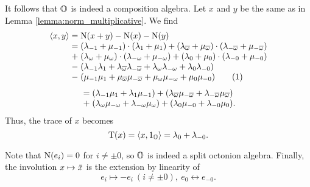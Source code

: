 \noindent It follows that $\mathbb{O}$ is indeed a composition algebra. Let $x$ and $y$ be the same as in Lemma \ref{lemma:norm_multiplicative}. We find
\begin{equation*}
	\begin{array}{r@{\;}c@{\;}l}
		\inner{x}{y} & = & \NN(x+y) - \NN(x) - \NN(y) \\
		
		    & = & (\lambda_{-1} + \mu_{-1}) \cdot ( \lambda_1 + \mu_1 )
		
			 +  (\lambda_{\bar{\omega}} + \mu_{\bar{\omega}}) \cdot
					(\lambda_{- \bar{\omega}} + \mu_{-\bar{\omega}}) \\
					
			& + & (\lambda_{\omega} + \mu_{\omega}) \cdot	
					( \lambda_{-\omega} + \mu_{-\omega} ) 
					
			 +  (\lambda_0 + \mu_0) \cdot (\lambda_{-0} + \mu_{-0}) \\
			
			& - & ( \lambda_{-1} \lambda_1 + \lambda_{\bar{\omega}} \lambda_{-\bar{\omega}}
					+ \lambda_{\omega} \lambda_{-\omega} + \lambda_0 \lambda_{-0} ) \\
			
			& - & ( \mu_{-1} \mu_1 + \mu_{\bar{\omega}} \mu_{-\bar{\omega}}
					+ \mu_{\omega} \mu_{-\omega} + \mu_0 \mu_{-0} ) \tag{\stepcounter{equation}\theequation} \\
	\end{array}
\end{equation*}
\begin{equation*}
	\begin{array}{r@{\;}c@{\;}l}
			& = & ( \lambda_{-1} \mu_{1} + \lambda_{1} \mu_{-1} )
			
			+ ( \lambda_{\bar{\omega}} \mu_{-\bar{\omega}} + 
					\lambda_{-\bar{\omega}} \mu_{\bar{\omega}} ) \\
					
			& + & ( \lambda_{\omega} \mu_{-\omega} + \lambda_{-\omega} \mu_{\omega} )
			
			+ ( \lambda_{0} \mu_{-0} + \lambda_{-0} \mu_{0} ).
	\end{array}
\end{equation*}
Thus, the trace of $x$ becomes
\begin{equation}
	\operatorname{T}(x) = \langle x, 1_{\mathbb{O}} \rangle = \lambda_0 + \lambda_{-0}.
\end{equation}

Note that $\mathord{\mathrm{N}}(e_i) = 0$ for $i \neq \pm 0$, so $\mathbb{O}$ is indeed a split octonion algebra.
Finally, the involution $x \mapsto \mathord{\mbox{\hspace*{0pt}}\,\overline{\!x\!\!\;}\!\:}\mbox{\hspace*{0pt}}$ is the extension by linearity of
\begin{equation}
	e_i \mapsto - e_i\ (i \neq \pm 0),\ e_0 \leftrightarrow e_{-0}.
\end{equation}

